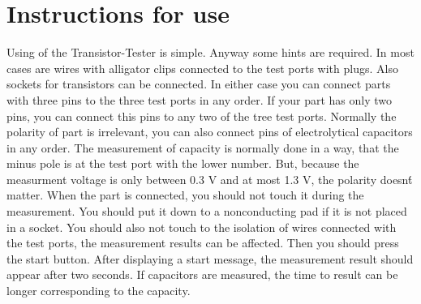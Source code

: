 \chapter{Instructions for use}
\label{sec:manual}
Using of the Transistor-Tester is simple.
Anyway some hints are required.
In most cases are wires with alligator clips connected to the test ports with plugs.
Also sockets for transistors can be connected.
In either case you can connect parts with three pins to the three test ports in any order.
If your part has only two pins, you can connect this pins to any two of the tree test ports.
Normally the polarity of part is irrelevant, you can also connect pins of electrolytical capacitors in any order. 
The measurement of capacity is normally done in a way, that the minus pole is at the test port with the lower number.
But, because the measurment voltage is only between 0.3 V and at most 1.3 V, the polarity doesn\'t matter.
When the part is connected, you should not touch it during the measurement. You should put it down to a nonconducting pad
if it is not placed in a socket. You should also not touch to the isolation of wires connected with the test ports,
the measurement results can be affected.
Then you should press the start button.
After displaying a start message, the measurement result should appear after two seconds.
If capacitors are measured, the time to result can be longer corresponding to the capacity.

